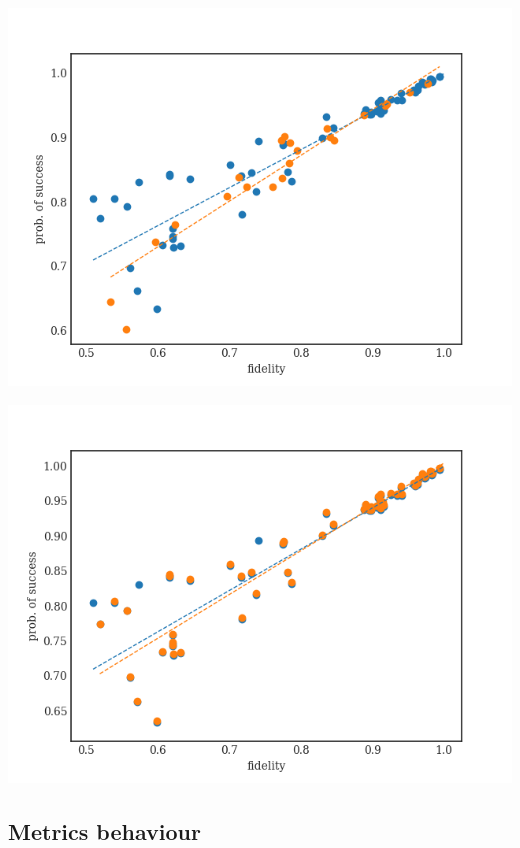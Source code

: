 \begin{center}
\includegraphics[width=.9\linewidth]{figures/f_ps_correlation_with_meas_error.png}
\end{center}

\begin{center}
\includegraphics[width=.9\linewidth]{figures/f_ps_correlation_no_meas_error.png}
\end{center}


\subsection*{Metrics behaviour}
\label{sec:org1e88750}


